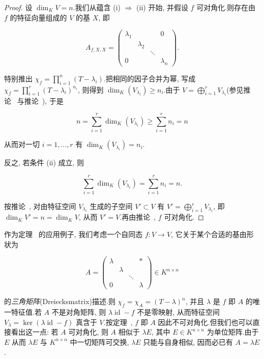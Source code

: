 \begin{proof}
设 $\dim_K V = n$.我们从蕴含 (i) $\Longrightarrow$ (ii) 开始, 并假设 $f$ 可对角化.则存在由 $f$ 的特征向量组成的 $V$ 的基 $X$, 即

\[
A_{f, X, X} = \left(\begin{array}{cccc}
\lambda_1 & & & 0 \\
 & \lambda_2 & & \\
 & & \ddots & \\
0 & & & \lambda_n
\end{array}\right)\text{.}\]

特别推出 $\chi_f = \prod_{i = 1}^{n}(T - \lambda_i)$.把相同的因子合并为幂, 写成 $\chi_f = \prod_{i = 1}^{r}(T - \lambda_i)^{n_i}$, 则得到 $\dim_K(V_{\lambda_i}) \geq n_i$.由于 $V = \bigoplus_{i = 1}^{r} V_{\lambda_i}$(参见推论~ 与推论~), 于是

\[
n = \sum_{i = 1}^{r} \dim_K(V_{\lambda_i}) \geq \sum_{i = 1}^{r} n_i = n\]

从而对一切 $i = 1, \ldots, r$ 有 $\dim_K(V_{\lambda_i}) = n_i$.

反之, 若条件 (ii) 成立, 则

\[
\sum_{i = 1}^{r} \dim_K(V_{\lambda_i}) = \sum_{i = 1}^{r} n_i = n\text{.}\]

按推论~, 对由特征空间 $V_{\lambda_i}$ 生成的子空间 $V' \subset V$ 有 $V' = \bigoplus_{i = 1}^{r} V_{\lambda_i}$, 即 $\dim_K V' = n = \dim_K V$, 从而 $V' = V$.再由推论~, $f$ 可对角化.
\end{proof}

作为定理~ 的应用例子, 我们考虑一个自同态 $f \colon V \longrightarrow V$, 它关于某个合适的基由形状为

\[
A = \left(\begin{array}{cccc}
\lambda & & & * \\
 & \lambda & & \\
 & & \ddots & \\
0 & & & \lambda
\end{array}\right) \in K^{n \times n}\]

的\emph{三角矩阵}(\textup{Dreiecksmatrix})描述.则 $\chi_f = \chi_A = (T - \lambda)^n$, 并且 $\lambda$ 是 $f$ 即 $A$ 的唯一特征值.若 $A$ 不是对角矩阵, 则 $\lambda \operatorname{id} - f$ 不是零映射, 从而特征空间 $V_\lambda = \ker(\lambda \operatorname{id} - f)$ 真含于 $V$.按定理~, $f$ 即 $A$ 因此不可对角化.但我们也可以直接看出这一点: 若 $A$ 可对角化, 则 $A$ 相似于 $\lambda E$, 其中 $E \in K^{n \times n}$ 为单位矩阵.由于 $E$ 从而 $\lambda E$ 与 $K^{n \times n}$ 中一切矩阵可交换, $\lambda E$ 只能与自身相似, 因而必已有 $A = \lambda E$.


